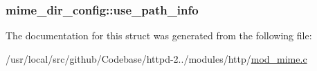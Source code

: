 \subsubsection[{\texorpdfstring{use\+\_\+path\+\_\+info}{use_path_info}}]{ mime\+\_\+dir\+\_\+config\+::use\+\_\+path\+\_\+info}\hypertarget{structmime__dir__config_a8e1626f9720547567876b93daa68436f}{}\label{structmime__dir__config_a8e1626f9720547567876b93daa68436f}


The documentation for this struct was generated from the following file\+:\begin{DoxyCompactItemize}
\item 
/usr/local/src/github/\+Codebase/httpd-\/2../modules/http/\hyperlink{mod__mime_8c}{mod\+\_\+mime.\+c}\end{DoxyCompactItemize}
